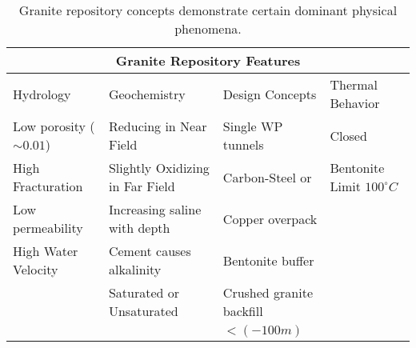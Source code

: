 %
\begin{table}[h!]
  \centering
  \footnotesize{
  \begin{tabular}{|l|l|l|l|}
    \multicolumn{4}{c}{\textbf{Granite Repository Features}}\\
    \hline
    Hydrology & Geochemistry & Design Concepts & Thermal Behavior \\ 
    \hline
    Low porosity ($\sim 0.01$)&Reducing in Near Field&Single WP tunnels&Closed\\
    High Fracturation & Slightly Oxidizing in Far Field & Carbon-Steel \cite{andra_granite:_2005}or & Bentonite Limit $100^\circ C$\\
    Low permeability  &  Increasing saline with depth \cite{von_lensa_red-impact_2008} & Copper overpack&\\
    High Water Velocity& Cement causes alkalinity \cite{andra_granite:_2005}& Bentonite buffer &\\
    & Saturated or Unsaturated & Crushed granite backfill \cite{von_lensa_red-impact_2008}& \\
    &&$<(-100m)$&\\
    \hline
  \end{tabular}
  \caption[Granite Repository Features]{Granite repository 
  concepts demonstrate certain dominant physical phenomena.}
  \label{tab:granite_tab}
  }
\end{table}


